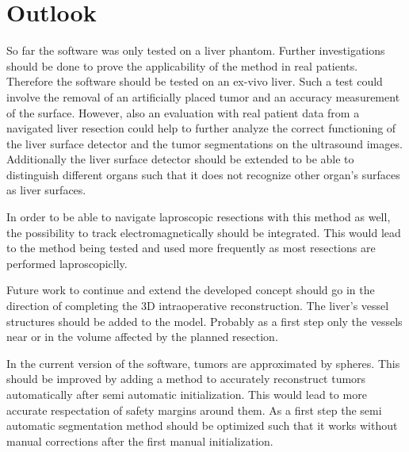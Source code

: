 %
%
%
\chapter{Outlook}
So far the software was only tested on a liver phantom. Further investigations
should be done to prove the applicability of the method in real patients.
Therefore the software should be tested on an ex-vivo liver. Such a test could
involve the removal of an artificially placed tumor and an accuracy measurement
of the surface. However, also an evaluation with real patient data from a
navigated liver resection could help to further analyze the correct functioning
of the liver surface detector and the tumor segmentations on the ultrasound
images. Additionally the liver surface detector should be extended to be able to
distinguish different organs such that it does not recognize other organ's
surfaces as liver surfaces.

In order to be able to navigate laproscopic resections with this method as well,
the possibility to track electromagnetically should be integrated. This would
lead to the method being tested and used more frequently as most resections are performed laproscopiclly.


Future work to continue and extend the developed concept should go in the
direction of completing the 3D intraoperative reconstruction. The liver's vessel
structures should be added to the model. Probably as a first step only the
vessels near or in the volume affected by the planned resection.

In the current version of the software, tumors are approximated by spheres.
This should be improved by adding a method to accurately reconstruct tumors
automatically after semi automatic initialization. This would lead to more accurate
respectation of safety margins around them. As a first step the semi automatic
segmentation method should be optimized such that it works without manual
corrections after the first manual initialization.

